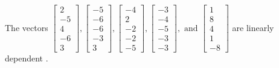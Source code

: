\begin{exercise}
\begin{exerciseStatement}
  \end{exerciseStatement}
  \begin{exerciseAnswer}
   The vectors \(\left[\begin{array}{r}
2 \\
-5 \\
4 \\
-6 \\
3
\end{array}\right] , \left[\begin{array}{r}
-5 \\
-6 \\
-6 \\
-3 \\
3
\end{array}\right] , \left[\begin{array}{r}
-4 \\
2 \\
-2 \\
-2 \\
-5
\end{array}\right] , \left[\begin{array}{r}
-3 \\
-4 \\
-5 \\
-3 \\
-3
\end{array}\right] , \text{ and } \left[\begin{array}{r}
1 \\
8 \\
4 \\
1 \\
-8
\end{array}\right]\) are 
  	 linearly dependent  .
  


  \end{exerciseAnswer}
\end{exercise}